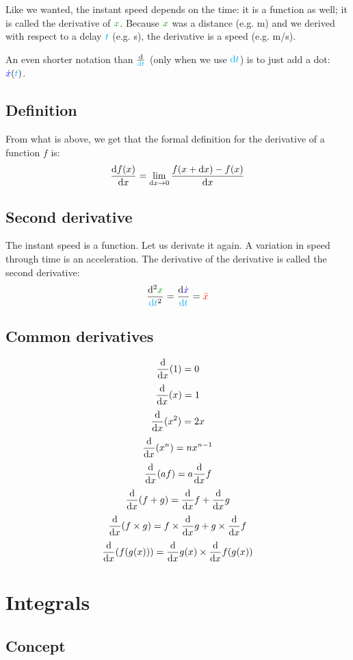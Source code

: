 Like we wanted, the instant speed depends on the time: it is a function
as well; it is called the derivative of $\dist{x}$. Because $\dist{x}$
was a distance (e.g. m) and we derived with respect to a delay $\textcolor{cyan}{t}$
(e.g. s), the derivative is a speed (e.g. m/s).

\begin{remark}
An even shorter notation than $\frac {\mathrm{d}} {\textcolor{cyan}{\mathrm{d} t}}$ (only when we
use $\textcolor{cyan}{\mathrm{d} t}$) is to just add a dot: $\textcolor{blue}{\dot x}(\textcolor{cyan}{t})$.
\end{remark}

\subsection{Definition}

From what is above, we get that the formal definition for the derivative
of a function $f$ is:
\[
\frac {\mathrm{d} f(x)} {\mathrm{d} x}
= \lim_{\mathrm{d} x \rightarrow 0} \frac {f(x+\mathrm{d} x) - f(x)} {\mathrm{d} x}
\]

\subsection{Second derivative}

The instant speed is a function. Let us derivate it again. A variation in
speed through time is an acceleration.  The derivative of the derivative
is called the second derivative: \[
\frac {\d^2 \dist{x}} {\delay{\dt}^2}
= \frac {\d \speed{\dot x}} {\delay{\dt}}
= \accel{\ddot x}
\]

\subsection{Common derivatives}

\[
\frac {\mathrm{d}} {\mathrm{d} x} (1)   = 0
\]
\[
\frac {\mathrm{d}} {\mathrm{d} x} (x)   = 1
\]
\[
\frac {\mathrm{d}} {\mathrm{d} x} (x^2) = 2x
\]
\[
\frac {\mathrm{d}} {\mathrm{d} x} (x^n) = n x^{n-1}
\]
\[
\frac {\mathrm{d}} {\mathrm{d} x} (a f)
= a \frac {\mathrm{d}} {\mathrm{d} x} f
\]
\[
\frac {\mathrm{d}} {\mathrm{d} x} (f + g)
= \frac {\mathrm{d}} {\mathrm{d} x} f
+ \frac {\mathrm{d}} {\mathrm{d} x} g
\]
\[
\frac {\mathrm{d}} {\mathrm{d} x} (f \times g)
= f \times \frac {\mathrm{d}} {\mathrm{d} x} g
+ g \times \frac {\mathrm{d}} {\mathrm{d} x} f
\]
\[
\frac {\mathrm{d}} {\mathrm{d} x} (f(g(x)))
= \frac {\mathrm{d}} {\mathrm{d} x} g(x)
\times \frac {\mathrm{d}} {\mathrm{d} x} f(g(x))
\]

\section{Integrals}

\subsection{Concept}

